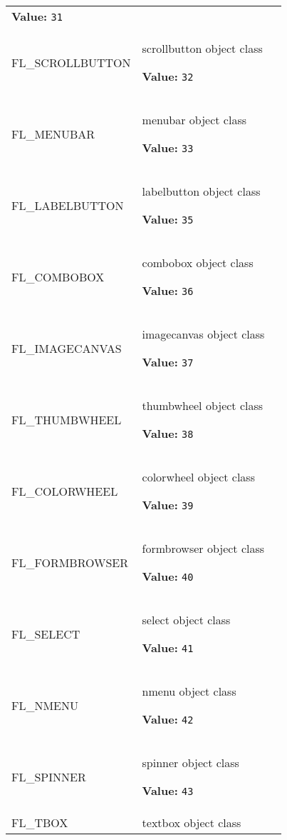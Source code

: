 \begin{longtable}{|p{\varnamewidth}|p{\vardescrwidth}|l}
\textbf{Value:} 
{\tt 31}&\\
\cline{1-2}
\raggedright F\-L\-\_\-S\-C\-R\-O\-L\-L\-B\-U\-T\-T\-O\-N\- & \raggedright scrollbutton object class

\textbf{Value:} 
{\tt 32}&\\
\cline{1-2}
\raggedright F\-L\-\_\-M\-E\-N\-U\-B\-A\-R\- & \raggedright menubar object class

\textbf{Value:} 
{\tt 33}&\\
\cline{1-2}
\raggedright F\-L\-\_\-L\-A\-B\-E\-L\-B\-U\-T\-T\-O\-N\- & \raggedright labelbutton object class

\textbf{Value:} 
{\tt 35}&\\
\cline{1-2}
\raggedright F\-L\-\_\-C\-O\-M\-B\-O\-B\-O\-X\- & \raggedright combobox object class

\textbf{Value:} 
{\tt 36}&\\
\cline{1-2}
\raggedright F\-L\-\_\-I\-M\-A\-G\-E\-C\-A\-N\-V\-A\-S\- & \raggedright imagecanvas object class

\textbf{Value:} 
{\tt 37}&\\
\cline{1-2}
\raggedright F\-L\-\_\-T\-H\-U\-M\-B\-W\-H\-E\-E\-L\- & \raggedright thumbwheel object class

\textbf{Value:} 
{\tt 38}&\\
\cline{1-2}
\raggedright F\-L\-\_\-C\-O\-L\-O\-R\-W\-H\-E\-E\-L\- & \raggedright colorwheel object class

\textbf{Value:} 
{\tt 39}&\\
\cline{1-2}
\raggedright F\-L\-\_\-F\-O\-R\-M\-B\-R\-O\-W\-S\-E\-R\- & \raggedright formbrowser object class

\textbf{Value:} 
{\tt 40}&\\
\cline{1-2}
\raggedright F\-L\-\_\-S\-E\-L\-E\-C\-T\- & \raggedright select object class

\textbf{Value:} 
{\tt 41}&\\
\cline{1-2}
\raggedright F\-L\-\_\-N\-M\-E\-N\-U\- & \raggedright nmenu object class

\textbf{Value:} 
{\tt 42}&\\
\cline{1-2}
\raggedright F\-L\-\_\-S\-P\-I\-N\-N\-E\-R\- & \raggedright spinner object class

\textbf{Value:} 
{\tt 43}&\\
\cline{1-2}
\raggedright F\-L\-\_\-T\-B\-O\-X\- & \raggedright textbox object class


\end{longtable}
